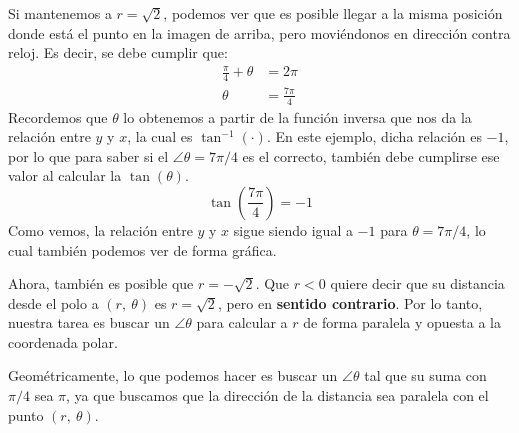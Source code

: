 \documentclass[12pt]{article}
\begin{document}
Si mantenemos a $r = \sqrt{2}$, podemos ver que es posible llegar a la misma posición donde está el punto en la imagen de arriba, pero moviéndonos en dirección contra reloj. Es decir, se debe cumplir que:
\begin{align*}
\frac{\pi}{4} + \theta &= 2\pi \\
\theta &= \frac{7\pi}{4}
\end{align*}
Recordemos que $\theta$ lo obtenemos a partir de la función inversa que nos da la relación entre $y$ y $x$, la cual es $\tan^{-1}(\cdot)$. En este ejemplo, dicha relación es $-1$, por lo que para saber si el $\angle \theta = 7\pi/4$ es el correcto, también debe cumplirse ese valor al calcular la $\tan(\theta)$.
\[
  \tan\left(\frac{7\pi}{4}\right) = -1
\]
Como vemos, la relación entre $y$ y $x$ sigue siendo igual a $-1$ para $\theta = 7\pi/4$, lo cual también podemos ver de forma gráfica.

\begin{figure}[hbt!]
\centering


\end{figure}

Ahora, también es posible que $r = - \sqrt{2}$. Que $r < 0$ quiere decir que su distancia desde el polo a $(r, \ \theta)$ es $r = \sqrt{2}$, pero en \textbf{sentido contrario}. Por lo tanto, nuestra tarea es buscar un $\angle \theta$ para calcular a $r$ de forma paralela y opuesta a la coordenada polar.

Geométricamente, lo que podemos hacer es buscar un $\angle \theta$ tal que su suma con $\pi/4$ sea $\pi$, ya que buscamos que la dirección de la distancia sea paralela con el punto $(r, \ \theta)$.
\end{document}
